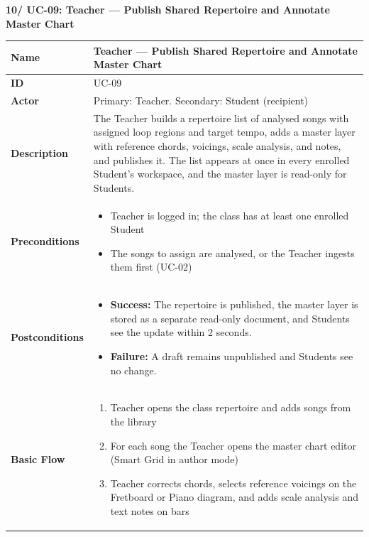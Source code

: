 \documentclass[a4paper]{article}
\newlength{\ucLeft}
\begin{document}
\vspace{0.5em}
\noindent\textbf{10/ UC-09: Teacher --- Publish Shared Repertoire and Annotate Master Chart}

\begin{longtable}{|>{\bfseries}p{\ucLeft}|p{\dimexpr\linewidth-\ucLeft-2\tabcolsep-2\arrayrulewidth}|}
\hline
Name & Teacher --- Publish Shared Repertoire and Annotate Master Chart \\ \hline
ID & UC-09 \\ \hline
Actor & Primary: Teacher. Secondary: Student (recipient) \\ \hline
Description & The Teacher builds a repertoire list of analysed songs with assigned loop regions and target tempo, adds a master layer with reference chords, voicings, scale analysis, and notes, and publishes it. The list appears at once in every enrolled Student's workspace, and the master layer is read-only for Students. \\ \hline
Preconditions &
\begin{itemize}[leftmargin=1em, nosep, topsep=2pt, partopsep=0pt, parsep=0pt, after=\strut]
    \item Teacher is logged in; the class has at least one enrolled Student
    \item The songs to assign are analysed, or the Teacher ingests them first (UC-02)
\end{itemize}
\\ \hline
Postconditions &
\begin{itemize}[leftmargin=1em, nosep, topsep=2pt, partopsep=0pt, parsep=0pt, after=\strut]
    \item \textbf{Success:} The repertoire is published, the master layer is stored as a separate read-only document, and Students see the update within 2 seconds.
    \item \textbf{Failure:} A draft remains unpublished and Students see no change.
\end{itemize}
\\ \hline
Basic Flow &
\begin{enumerate}[leftmargin=1.5em, nosep, topsep=2pt, partopsep=0pt, parsep=0pt, after=\strut]
    \item Teacher opens the class repertoire and adds songs from the library
    \item For each song the Teacher opens the master chart editor (Smart Grid in author mode)
    \item Teacher corrects chords, selects reference voicings on the Fretboard or Piano diagram, and adds scale analysis and text notes on bars

\end{enumerate}
\end{longtable}
\end{document}
